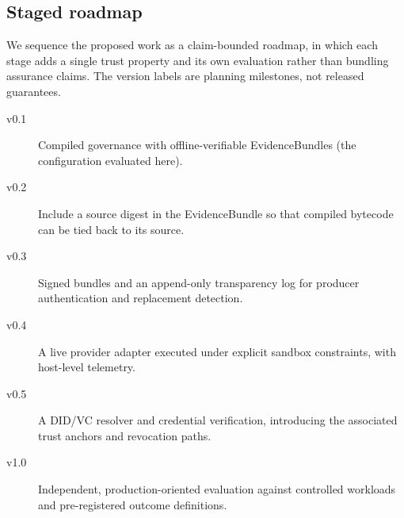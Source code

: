 \subsection{Staged roadmap}
We sequence the proposed work as a claim-bounded roadmap, in which each stage
adds a single trust property and its own evaluation rather than bundling
assurance claims.  The version labels are planning milestones, not released
guarantees.

\begin{description}
\item[v0.1] Compiled governance with offline-verifiable EvidenceBundles
(the configuration evaluated here).
\item[v0.2] Include a source digest in the EvidenceBundle so that compiled
bytecode can be tied back to its source.
\item[v0.3] Signed bundles and an append-only transparency log for producer
authentication and replacement detection.
\item[v0.4] A live provider adapter executed under explicit sandbox
constraints, with host-level telemetry.
\item[v0.5] A DID/VC resolver and credential verification, introducing the
associated trust anchors and revocation paths.
\item[v1.0] Independent, production-oriented evaluation against controlled
workloads and pre-registered outcome definitions.
\end{description}
